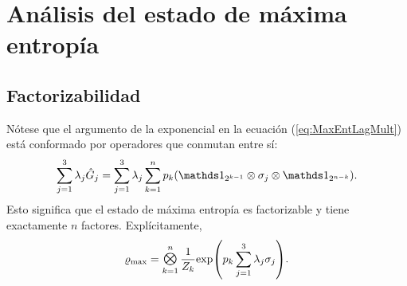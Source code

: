 \section{Análisis del estado de máxima entropía}

\subsection{Factorizabilidad}

Nótese que el argumento de la exponencial en la ecuación (\ref{eq:MaxEntLagMult}) está conformado por operadores que conmutan entre sí:
\begin{equation}
    \sum_{j=1}^{3}\lambda_{j}\hat{G}_{j}=\sum_{j=1}^{3}\lambda_{j}\sum_{k=1}^{n}p_{k}(\Id_{2^{k-1}}\otimes\sigma_{j}\otimes\Id_{2^{n-k}}).\nonumber
\end{equation}
Esto significa que el estado de máxima entropía es factorizable y tiene exactamente $n$ factores. Explícitamente,
\begin{equation}\label{eq:MaxEntSeparable}
    \varrho_{\max}=\Motimes_{k=1}^{n}\frac{1}{Z_{k}}\text{exp}\qty(p_{k}\sum_{j=1}^{3}\lambda_{j}\sigma_{j}).
\end{equation}

